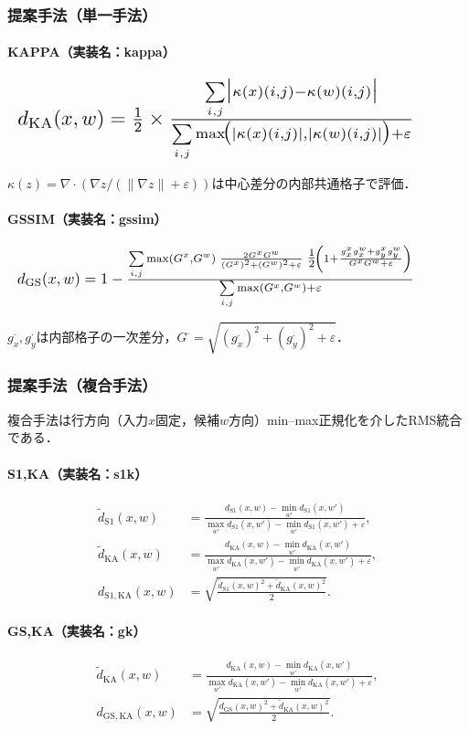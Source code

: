 \documentclass{jarticle}
\theoremstyle{definition}
\newcommand{\halfeq}[2][0.85\linewidth]{%
  \begin{equation}
    \makebox[\linewidth][l]{\resizebox{#1}{!}{\ensuremath{#2}}}%
  \end{equation}
}
\begin{document}
\subsubsection*{提案手法（単一手法）}
\paragraph{KAPPA（実装名：kappa）}
\halfeq[0.90\linewidth]{%
d_{\mathrm{KA}}(x,w)=\tfrac{1}{2}\times
\frac{\sum\limits_{i,j}\bigl|\kappa(x)(i,j)-\kappa(w)(i,j)\bigr|}
{\sum\limits_{i,j}\max\!\bigl(|\kappa(x)(i,j)|,|\kappa(w)(i,j)|\bigr)+\varepsilon}%
}
$\kappa(z)=\nabla\cdot\left(\nabla z/(\|\nabla z\|+\varepsilon)\right)$は中心差分の内部共通格子で評価．

\paragraph{GSSIM（実装名：gssim）}
\halfeq[0.90\linewidth]{%
d_{\mathrm{GS}}(x,w)=1-
\frac{\sum\limits_{i,j} \max(G^x,G^w)\;
\frac{2G^xG^w}{(G^x)^2+(G^w)^2+\varepsilon}\;
\tfrac{1}{2}\!\left(1+\frac{g_x^x g_x^w+g_y^x g_y^w}{G^x G^w+\varepsilon}\right)
}{\sum\limits_{i,j}\max(G^x,G^w)+\varepsilon}%
}
$g_x^\cdot,g_y^\cdot$は内部格子の一次差分，$G^\cdot=\sqrt{(g_x^\cdot)^2+(g_y^\cdot)^2+\varepsilon}$．

\subsubsection*{提案手法（複合手法）}
複合手法は行方向（入力$x$固定，候補$w$方向）min–max正規化を介したRMS統合である．
\paragraph{S1,KA（実装名：s1k）}
\begin{align}
\tilde d_{\mathrm{S1}}(x,w)&=\frac{d_{\mathrm{S1}}(x,w)-\min_{w'}d_{\mathrm{S1}}(x,w')}{\max_{w'}d_{\mathrm{S1}}(x,w')-\min_{w'}d_{\mathrm{S1}}(x,w')+\varepsilon},\\
\tilde d_{\mathrm{KA}}(x,w)&=\frac{d_{\mathrm{KA}}(x,w)-\min_{w'}d_{\mathrm{KA}}(x,w')}{\max_{w'}d_{\mathrm{KA}}(x,w')-\min_{w'}d_{\mathrm{KA}}(x,w')+\varepsilon},\\
d_{\mathrm{S1,KA}}(x,w)&=\sqrt{\frac{\tilde d_{\mathrm{S1}}(x,w)^2+\tilde d_{\mathrm{KA}}(x,w)^2}{2}}.
\end{align}

\paragraph{GS,KA（実装名：gk）}
\begin{equation}
\begin{aligned}
\tilde d_{\mathrm{KA}}(x,w)
&=\frac{d_{\mathrm{KA}}(x,w)-\min_{w'}d_{\mathrm{KA}}(x,w')}{\max_{w'}d_{\mathrm{KA}}(x,w')-\min_{w'}d_{\mathrm{KA}}(x,w')+\varepsilon},\\
d_{\mathrm{GS,KA}}(x,w)
&=\sqrt{\frac{d_{\mathrm{GS}}(x,w)^2+\tilde d_{\mathrm{KA}}(x,w)^2}{2}}.
\end{aligned}
\end{equation}
\end{document}
